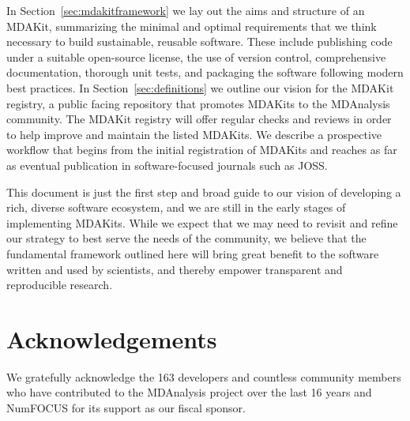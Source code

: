 \documentclass[9pt,whitepaper]{livecoms}
\begin{document}
In Section~\ref{sec:mdakitframework} we lay out the aims and structure of an MDAKit, summarizing the minimal and optimal requirements that we think necessary to build sustainable, reusable software. These include publishing code under a suitable open-source license, the use of version control, comprehensive documentation, thorough unit tests, and packaging the software following modern best practices. In Section~\ref{sec:definitions} we outline our vision for the MDAKit registry, a public facing repository that promotes MDAKits to the MDAnalysis community. The MDAKit registry will offer regular checks and reviews in order to help improve and maintain the listed MDAKits. We describe a prospective workflow that begins from the initial registration of MDAKits and reaches as far as eventual publication in software-focused journals such as JOSS.

This document is just the first step and broad guide to our vision of developing a rich, diverse software ecosystem, and we are still in the early stages of implementing MDAKits. While we expect that we may need to revisit and refine our strategy to best serve the needs of the community, we believe that the fundamental framework outlined here will bring great benefit to the software written and used by scientists, and thereby empower transparent and reproducible research. 


\section*{Acknowledgements}

We gratefully acknowledge the 163 developers and countless community members who have contributed to the MDAnalysis project over the last 16 years and NumFOCUS for its support as our fiscal sponsor.


%
%
\end{document}
